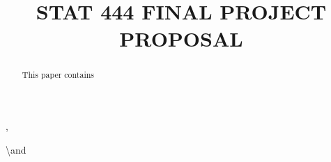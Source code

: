 \documentclass[aoas]{imsart}
\numberwithin{equation}{section}
\theoremstyle{plain}
\theoremstyle{remark}
\begin{document}
\begin{frontmatter}
\title{STAT 444 FINAL PROJECT PROPOSAL}
\runtitle{}



\begin{aug}


\author[A]{ 
  }
  ,
\author[A]{ 
  }
  
\author[A]{ 
  }
  \textbackslash and
\author[A]{ 
  }
  

\address[A]{Department of Statistics and Actuarial Science, University
of Waterloo,
  }
\end{aug}

\begin{abstract}
This paper contains
\end{abstract}


\begin{keyword}
\end{keyword}

\end{frontmatter}


\newenvironment{kframe}{}{}
\end{document}
